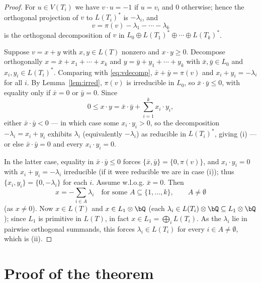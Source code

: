 \begin{proof}
For $u\in V(T_i)$ we have $v\cdot u=-1$ if $u=v_i$ and $0$ otherwise; hence the orthogonal
projection of $v$ to $L(T_i)^\ast$ is $-\lambda_i$, and
\begin{equation}
\label{eq:vdecomp}
v=\pi(v)-\lambda_1-\cdots-\lambda_k
\end{equation}
is the orthogonal decomposition of $v$ in $L_0\oplus L(T_1)^\ast\oplus\cdots\oplus
L(T_k)^\ast$.

Suppose $v=x+y$ with $x,y\in L(T)$ nonzero and $x\cdot y\ge0$.  Decompose orthogonally
$x=\bar x+x_1+\cdots+x_k$ and $y=\bar y+y_1+\cdots+y_k$ with $\bar x,\bar y\in L_0$ and
$x_i,y_i\in L(T_i)^\ast$.  Comparing with \eqref{eq:vdecomp}, $\bar x+\bar y=\pi(v)$ and
$x_i+y_i=-\lambda_i$ for all $i$.  By Lemma~\ref{lem:irred}, $\pi(v)$ is irreducible in
$L_0$, so $\bar x\cdot\bar y\le0$, with equality only if $\bar x=0$ or $\bar y=0$.  Since
\[
0\le x\cdot y=\bar x\cdot\bar y+\sum_{i=1}^k x_i\cdot y_i,
\]
either $\bar x\cdot\bar y<0$ — in which case some $x_i\cdot y_i>0$, so the decomposition
$-\lambda_i=x_i+y_i$ exhibits $\lambda_i$ (equivalently $-\lambda_i$) as reducible in
$L(T_i)^\ast$, giving (i) — or else $\bar x\cdot\bar y=0$ and every $x_i\cdot y_i=0$.

In the latter case, equality in $\bar x\cdot\bar y\le0$ forces $\{\bar x,\bar
y\}=\{0,\pi(v)\}$, and $x_i\cdot y_i=0$ with $x_i+y_i=-\lambda_i$ irreducible (if it were
reducible we are in case (i)); thus $\{x_i,y_i\}=\{0,-\lambda_i\}$ for each $i$.  Assume
w.l.o.g. $\bar x=0$.  Then
\[
x=-\sum_{i\in A}\lambda_i\quad\text{for some }A\subseteq\{1,\dots,k\},\qquad A\ne\emptyset
\]
(as $x\ne0$).  Now $x\in L(T)$ and $x\in L_1\otimes\bQ$ (each $\lambda_i\in L(T_i)\otimes\bQ
\subseteq L_1\otimes\bQ$); since $L_1$ is primitive in $L(T)$, in fact $x\in L_1=
\bigoplus_iL(T_i)$.  As the $\lambda_i$ lie in pairwise orthogonal summands, this forces
$\lambda_i\in L(T_i)$ for every $i\in A\ne\emptyset$, which is (ii).
\end{proof}

\section{Proof of the theorem}
\label{sec:finale}

